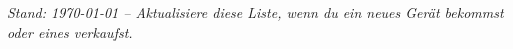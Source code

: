 \documentclass[a4paper,landscape,8pt]{extarticle}
\begin{document}
\vspace{4mm}

\begin{center}
\end{center}

\vfill

\begin{center}
\footnotesize\textit{Stand: \today{} – Aktualisiere diese Liste, wenn du ein neues Gerät bekommst oder eines verkaufst.}
\end{center}
\end{document}
